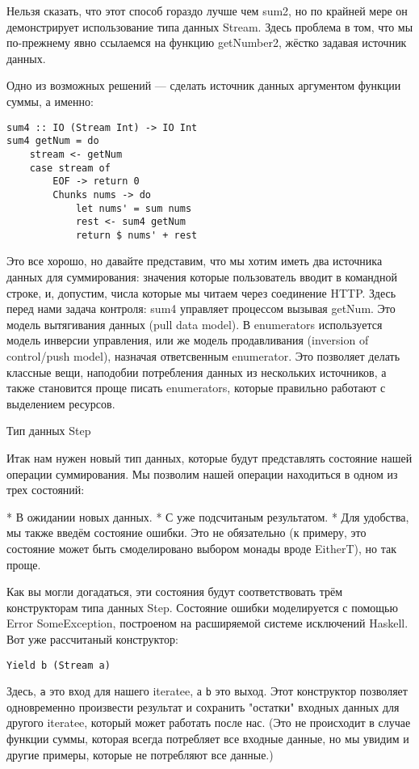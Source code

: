 Нельзя сказать, что этот способ гораздо лучше чем sum2, но по крайней мере он демонстрирует использование типа данных Stream. Здесь проблема в том, что мы по-прежнему явно ссылаемся на функцию getNumber2, жёстко задавая источник данных.

Одно из возможных решений --- сделать источник данных аргументом функции суммы, а именно:

\begin{lstlisting}
sum4 :: IO (Stream Int) -> IO Int
sum4 getNum = do
    stream <- getNum
    case stream of
        EOF -> return 0
        Chunks nums -> do
            let nums' = sum nums
            rest <- sum4 getNum
            return $ nums' + rest
\end{lstlisting}

Это все хорошо, но давайте представим, что мы хотим иметь два источника данных для суммирования: значения которые пользователь вводит в командной строке, и,  допустим, числа которые мы читаем через соединение HTTP. Здесь перед нами задача контроля: sum4 управляет процессом вызывая getNum. Это модель вытягивания данных (pull data model). В enumerators используется модель инверсии управления, или же модель продавливания (inversion of control/push model), назначая ответсвенным enumerator. Это позволяет делать классные вещи, наподобии потребления данных из нескольких источников, а также становится проще писать enumerators, которые правильно работают с выделением ресурсов.

Тип данных Step

Итак нам нужен новый тип данных, которые будут представлять состояние нашей операции суммирования. Мы позволим нашей операции находиться в одном из трех состояний:

* В ожидании новых данных.
* С уже подсчитаным результатом.
* Для удобства, мы также введём состояние ошибки. Это не обязательно (к примеру, это состояние может быть смоделировано выбором монады вроде EitherT), но так проще.

Как вы могли догадаться, эти состояния будут соответствовать трём конструкторам типа данных Step. Состояние ошибки моделируется с помощью Error SomeException, построеном на расширяемой системе исключений Haskell. Вот уже рассчитаный конструктор:

\begin{lstlisting}
Yield b (Stream a)
\end{lstlisting}

Здесь, \lstinline'a' это вход для нашего iteratee, а \lstinline'b' это выход. Этот конструктор позволяет одновременно произвести результат и сохранить "остатки" входных данных для другого iteratee, который может работать после нас. (Это не происходит в случае функции суммы, которая всегда потребляет все входные данные, но мы увидим и другие примеры, которые не потребляют все данные.)


